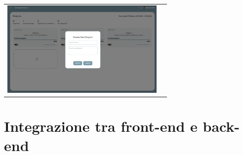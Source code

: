 \documentclass{report}
\begin{document}
\begin{center}
\begin{longtable}{cc}
\includegraphics[width=8cm]{15.png} \\
\end{longtable}

\end{center}

\section{Integrazione tra front-end e back-end}
\end{document}
